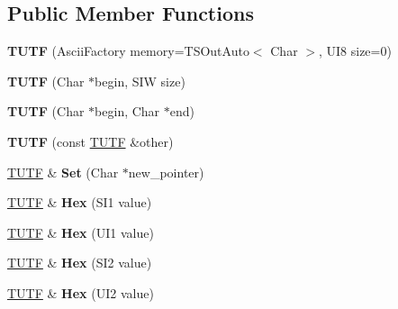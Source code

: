 \subsection*{Public Member Functions}
\begin{DoxyCompactItemize}
\item 
\mbox{\label{struct___1_1_t_u_t_f_a39689f4bdee1c84784381d54b44a130f}} 
{\bfseries T\+U\+TF} (Ascii\+Factory memory=T\+S\+Out\+Auto$<$ Char $>$, U\+I8 size=0)
\item 
\mbox{\label{struct___1_1_t_u_t_f_a33fdb134f2888f5c99bae2d250ff375b}} 
{\bfseries T\+U\+TF} (Char $\ast$begin, S\+IW size)
\item 
\mbox{\label{struct___1_1_t_u_t_f_a8676a2619c1aed38d8a55f3d36611128}} 
{\bfseries T\+U\+TF} (Char $\ast$begin, Char $\ast$end)
\item 
\mbox{\label{struct___1_1_t_u_t_f_af3f3eab5a02ce1925a758a7c743b2b74}} 
{\bfseries T\+U\+TF} (const \mbox{\hyperlink{struct___1_1_t_u_t_f}{T\+U\+TF}} \&other)
\item 
\mbox{\label{struct___1_1_t_u_t_f_a7aac4c9fea090670ba23b77e48de5ff2}} 
\mbox{\hyperlink{struct___1_1_t_u_t_f}{T\+U\+TF}} \& {\bfseries Set} (Char $\ast$new\+\_\+pointer)
\item 
\mbox{\label{struct___1_1_t_u_t_f_ade4df63d5c12600296c8d7d0c861e71d}} 
\mbox{\hyperlink{struct___1_1_t_u_t_f}{T\+U\+TF}} \& {\bfseries Hex} (S\+I1 value)
\item 
\mbox{\label{struct___1_1_t_u_t_f_afc5c949c3411d293b6b3a1fcd9e75593}} 
\mbox{\hyperlink{struct___1_1_t_u_t_f}{T\+U\+TF}} \& {\bfseries Hex} (U\+I1 value)
\item 
\mbox{\label{struct___1_1_t_u_t_f_a585c670a0d8973377a54245b6e30b7ee}} 
\mbox{\hyperlink{struct___1_1_t_u_t_f}{T\+U\+TF}} \& {\bfseries Hex} (S\+I2 value)
\item 
\mbox{\label{struct___1_1_t_u_t_f_a68ba5d60330097402a70f4d9e2d7fdce}} 
\mbox{\hyperlink{struct___1_1_t_u_t_f}{T\+U\+TF}} \& {\bfseries Hex} (U\+I2 value)

\end{DoxyCompactItemize}
